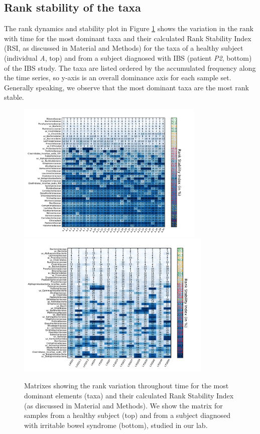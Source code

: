 \subsection*{Rank stability of the taxa} 
The rank dynamics and stability plot in Figure \ref{fig:corrank} shows the variation in the rank with time for the most dominant taxa and their calculated Rank Stability Index (RSI, as discussed in Material and Methods) for the taxa of a healthy subject (individual \emph{A}, top) and from a subject diagnosed with IBS (patient \emph{P2}, bottom) of the IBS study\cite{IBS}. The taxa are listed ordered by the accumulated frequency along the time series, so y-axis is an overall dominance axis for each sample set. Generally speaking, we observe that the most dominant taxa are the most rank stable. 

\begin{figure}
	\centering
	\vspace*{-10mm} %
	\includegraphics[width=0.8\textwidth]{results/corrank/IBS_h_A_amplicons_family_Rank.pdf}\vspace*{-3mm} %
	\hspace*{-4.5mm}\includegraphics[width=0.83\textwidth]{results/corrank/IBS_P2_Metatranscriptores_Rank.pdf}
	\caption{Matrixes showing the rank variation throughout time for the most dominant elements (taxa) and their calculated Rank Stability Index (as discussed in Material and Methods). We show the matrix for samples from a healthy subject (top) and from a subject diagnosed with irritable bowel syndrome (bottom), studied in our lab\cite{IBS}.}
	\label{fig:corrank}
\end{figure}

